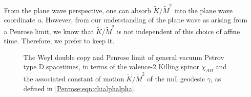 From the plane wave perspective, one can absorb $\tilde{K}/\tilde{M}^2$ into the plane wave coordinate $u$. However, from our understanding of the plane wave as arising from a Penrose limit, we know that $\tilde{K}/\tilde{M}^2$ is not independent of this choice of affine time. Therefore, we prefer to keep it.


\begin{figure}[t!]
        \caption{The Weyl double copy and Penrose limit of general vacuum Petrov type D spacetimes, in  terms of
            the valence-2 Killing spinor $\chi_{AB}$ and the associated constant of motion $\tilde{K}/\tilde{M}^2$ of
    the null geodesic $\gamma$, as defined in \eqref{Penrose:eqn:chialphalpha}.} \label{Penrose:fig:schematicD} 
\end{figure}

